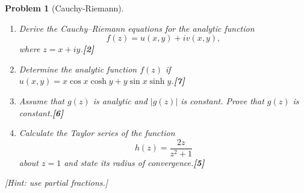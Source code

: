 \documentclass[a4paper]{article}
\theoremstyle{new}
\newtheorem{qns}{Problem}[section]
\begin{document}
\newpage
\begin{qns}[Cauchy-Riemann]
\leavevmode
\begin{enumerate}[label=(\alph*)]
\item Derive the Cauchy–Riemann equations for the analytic function
$$f(z)=u(x,y)+iv(x,y),$$
where $z = x + iy$.\hfill \textbf{[2]}
\item Determine the analytic function $f(z)$ if $u(x, y) = x\cos x \cosh y + y \sin x \sinh y$.\hfill \textbf{[7]}
\item Assume that $g(z)$ is analytic and $|g(z)|$ is constant. Prove that $g(z)$ is constant.\hfill \textbf{[6]}
\item Calculate the Taylor series of the function
$$h(z)=\frac{2z}{z^2+1}$$
about $z = 1$ and state its radius of convergence.\hfill \textbf{[5]}
\end{enumerate}
[Hint: use partial fractions.]
\end{qns}
\end{document}

